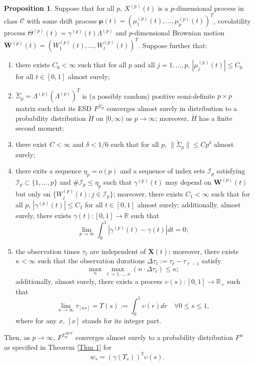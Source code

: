 \documentclass[a4paper,11pt]{article}
\theoremstyle{plain}
\theoremstyle{definition}
\newtheorem{prps}[thm]{Proposition}
\newcommand{\MR}{\mathbb{R}}
\begin{document}
    \begin{prps}
    	Suppose that for all $p$, $X^{(p)}(t)$ is a $p$-dimensional process in class $\mathcal{C}$ with some drift process $\boldsymbol{\mu}(t) = (\mu_1^{(p)}(t), \dots, \mu_p^{(p)}(t))^T$, covolatility process $\Theta^{(p)}(t) = \gamma^{(p)}(t) \Lambda^{(p)}$ and $p$-dimensional Brownian motion $\mathbf{W}^{(p)}(t) = (W_1^{(p)}(t), \dots, W_t^{(p)}(t) )^T$. Suppose further that:
    	\begin{enumerate}
    		\item there exists $C_0 < \infty$ such that for all $p$ and all $j = 1, \dots, p$, $|\mu_j^{(p)}(t)| \leq C_0$ for all $t \in [0, 1]$ almost surely;
    		\item $\breve{\Sigma}_p = \Lambda^{(p)} ( \Lambda^{(p)})^T $ is (a possibly random) positive semi-definite $p \times p$ matrix such that its ESD $F^{\breve{\Sigma}_p}$ converges almost surely in distribution to a probability distribution $\breve{H}$ on $[0,\infty)$ as $p \rightarrow \infty$; moreover, $\breve{H}$ has a finite second moment;
    		\item there exist $C < \infty$ and $\delta < 1/6$ such that for all $p$, $\|\breve{\Sigma}_p \| \leq Cp^\delta$ almost surely;
    		\item there exits a sequence $\eta_p = o(p)$ and a sequence of index sets $\mathcal{I}_p$ satisfying $\mathcal{I}_p \subset \{1, \dots, p\}$ and $\#\mathcal{I}_p \leq \eta_p$ such that $\gamma^{(p)}(t)$ may depend on $\mathbf{W}^{(p)}(t)$ but only on $\{W_j^{(p)}(t): j \in \mathcal{I}_p\}$; moreover, there exists $C_1 < \infty$ such that for all $p$, $|\gamma^{(p)}(t)| \leq C_1$ for all $t \in [0, 1]$ almost surely; additionally, almost surely, there exists $\gamma(t): [0, 1] \rightarrow \MR$ such that
    		\[ \lim_{p \rightarrow \infty} \int_{0}^{1} |\gamma^{(p)}(t) - \gamma(t) |dt = 0;  \]
    		\item the observation times $\tau_\ell$ are independent of $\mathbf{X}(t)$; moreover, there exists $\kappa < \infty$ such that the observation durations $\Delta \tau_\ell := \tau_\ell - \tau_{\ell-1}$ satisfy
    		\[ \max_{n} \max_{\ell = 1, \dots, n} (n \cdot \Delta \tau_\ell ) \leq \kappa; \]
    		additionally, almost surely, there exists a process $\upsilon(s) : [0, 1] \rightarrow \MR_+$ such that
    		\[ \lim_{n \rightarrow \infty} \tau_{[ns]} = \Upsilon(s) :=\int_{0}^{1} \upsilon(r) dr \quad \forall 0 \leq s \leq 1, \]
    		where for any $x$, $[x]$ stands for its integer part.
     	\end{enumerate}
     	Then, as $p \rightarrow \infty$, $F^{\Sigma_p^{RCV}}$ converges almost surely to a probability distribution $F^w$ as specified in Theorem \ref{Thm 1} for
     	\[ w_s = (\gamma(\Upsilon_s))^2 \upsilon(s). \]
    \end{prps}
    
\end{document}
